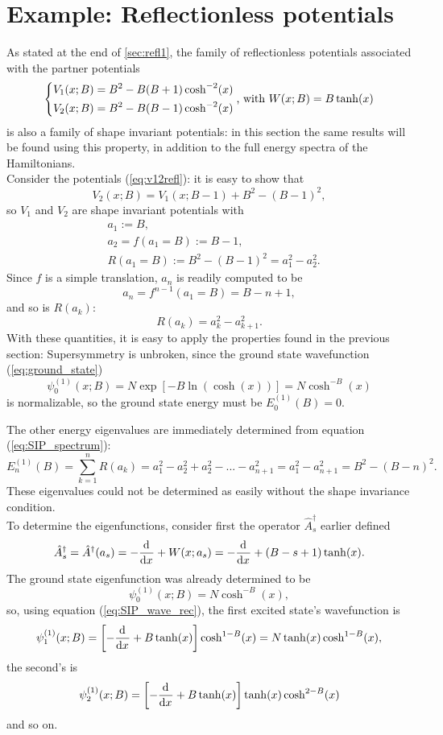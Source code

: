 \section{Example: Reflectionless potentials}
As stated at the end of \ref{sec:refl1}, the family of reflectionless potentials
associated with the partner potentials
\begin{equation}
    \begin{dcases}
	V_1(x;B)= B^2-B(B+1)\cosh^{-2}(x)\\
	V_2(x;B)= B^2-B(B-1)\cosh^{-2}(x)
	\label{eq:v12refl}
    \end{dcases}\text{, with }
    W(x;B)=B\tanh(x)
\end{equation}
is also a family of shape invariant potentials: in this section the same results
will be found using this property, in addition to the full energy spectra of the
Hamiltonians.\\

Consider the potentials (\ref{eq:v12refl}): it is easy to show that
$$V_2(x;B)=V_1(x;B-1)+B^2-(B-1)^2,$$
so $V_1$ and $V_2$ are shape invariant potentials with
\begin{align*}
&a_1:=B,\\
&a_2=f(a_1=B):=B-1,\\
&R(a_1=B):=B^2-(B-1)^2 = a_1^2-a_2^2.
\end{align*}
Since $f$ is a simple translation, $a_n$ is readily computed to be
$$a_n = f^{n-1}(a_1=B)=B-n+1,$$
and so is $R(a_k)$:
$$R(a_k) = a_k^2-a_{k+1}^2.$$
With these quantities, it is easy to apply the properties found in the previous section:
Supersymmetry is unbroken, since the ground state wavefunction (\ref{eq:ground_state})
$$\psi^{(1)}_0(x;B) = N\exp\left[-B\ln\left(\cosh(x)\right)\right]=N\cosh^{-B}(x)$$
is normalizable, so the ground state energy must be $E_0^{(1)}(B)=0$.

 The other energy eigenvalues are immediately determined from equation
(\ref{eq:SIP_spectrum}):
$$E_n^{(1)}(B) = \sum_{k=1}^{n}R(a_k) = a_1^2-a_2^2+a^2_2-...-a_{n+1}^2 =
a_1^2-a_{n+1}^2=B^2-(B-n)^2.$$
These eigenvalues could not be determined as easily without the shape invariance condition.\\

To determine the eigenfunctions, consider first the operator $\hat A^\dagger_s$
earlier defined
\begin{gather*}
\hat A_s^\dagger = \hat A^\dagger(a_s) = - \dv[]{}{x} + W(x;a_s) = -\dv[]{}{x}+(B-s+1)\tanh(x).
\end{gather*}
The ground state eigenfunction was already determined to be
$$\psi_0^{(1)}(x;B) = N\cosh^{-B}(x),$$
so, using equation (\ref{eq:SIP_wave_rec}), the first excited state's wavefunction is
$$\psi_1^{(1)}(x;B)=\left[-\dv[]{}{x}+B\tanh(x)\right]\cosh^{1-B}(x)=
N\tanh(x)\cosh^{1-B}(x),$$
the second's is
$$\psi_2^{(1)}(x;B)=\left[-\dv[]{}{x}+B\tanh(x)\right]\tanh(x)\cosh^{2-B}(x)$$
and so on.
